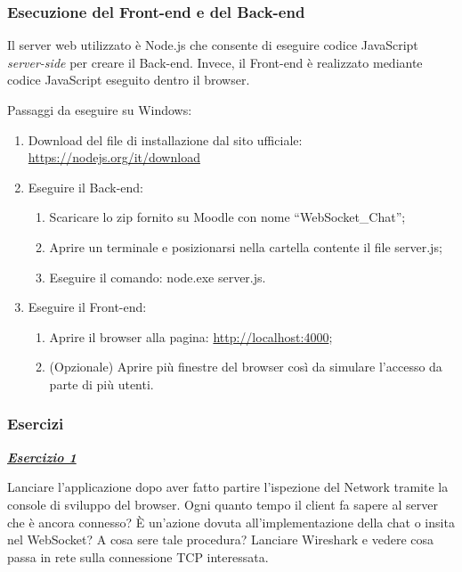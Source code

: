 \documentclass[a4paper]{article}
\newcommand{\dquotes}[1]{``#1''}
\begin{document}
	\subsubsection{Esecuzione del Front-end e del Back-end}
	
	Il server web utilizzato è Node.js che consente di eseguire codice JavaScript \emph{server-side} per creare il Back-end. Invece, il Front-end è realizzato mediante codice JavaScript eseguito dentro il browser.\newline
	
	\noindent
	Passaggi da eseguire su Windows:
	\begin{enumerate}
		\item Download del file di installazione dal sito ufficiale: \url{https://nodejs.org/it/download}
		
		\item Eseguire il Back-end:
		\begin{enumerate}
			\item Scaricare lo zip fornito su Moodle con nome \dquotes{WebSocket\_Chat};
			\item Aprire un terminale e posizionarsi nella cartella contente il file \textsf{server.js};
			\item Eseguire il comando: \textsf{node.exe server.js}.
		\end{enumerate}
		
		\item Eseguire il Front-end:
		\begin{enumerate}
			\item Aprire il browser alla pagina: \url{http://localhost:4000};
			\item (Opzionale) Aprire più finestre del browser così da simulare l'accesso da parte di più utenti.
		\end{enumerate}
	\end{enumerate}\newpage
	
	\subsubsection[\textcolor{Red3}{\textbf{Esercizi}}]{Esercizi}
	
	\noindent	
	\textcolor{Red3}{\textbf{\emph{\underline{Esercizio 1}}}}\newline
	
	\noindent
	Lanciare l'applicazione dopo aver fatto partire l'ispezione del Network tramite la console di sviluppo del browser. Ogni quanto tempo il client fa sapere al server che è ancora connesso? È un'azione dovuta all'implementazione della chat o insita nel WebSocket? A cosa sere tale procedura?\newline
	Lanciare Wireshark e vedere cosa passa in rete sulla connessione TCP interessata.\newline
	
\end{document}

